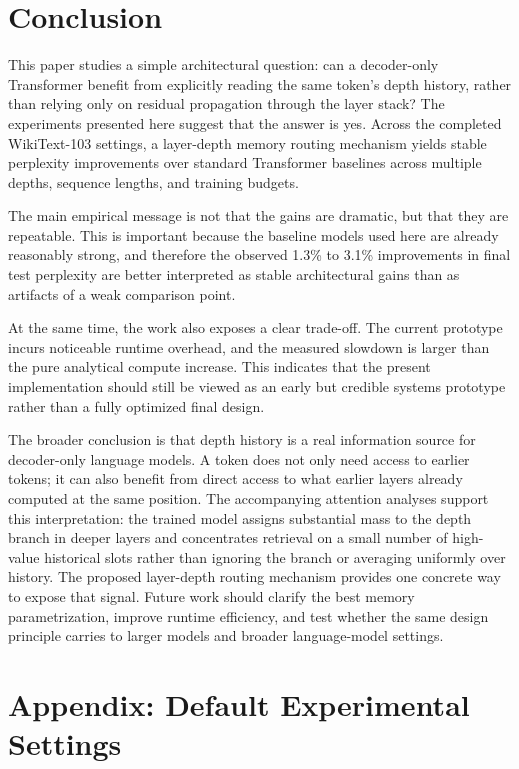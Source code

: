 \documentclass[11pt]{article}
\begin{document}
\section{Conclusion}

This paper studies a simple architectural question: can a decoder-only Transformer benefit from explicitly reading the same token's depth history, rather than relying only on residual propagation through the layer stack? The experiments presented here suggest that the answer is yes. Across the completed WikiText-103 settings, a layer-depth memory routing mechanism yields stable perplexity improvements over standard Transformer baselines across multiple depths, sequence lengths, and training budgets.

The main empirical message is not that the gains are dramatic, but that they are repeatable. This is important because the baseline models used here are already reasonably strong, and therefore the observed 1.3\% to 3.1\% improvements in final test perplexity are better interpreted as stable architectural gains than as artifacts of a weak comparison point.

At the same time, the work also exposes a clear trade-off. The current prototype incurs noticeable runtime overhead, and the measured slowdown is larger than the pure analytical compute increase. This indicates that the present implementation should still be viewed as an early but credible systems prototype rather than a fully optimized final design.

The broader conclusion is that depth history is a real information source for decoder-only language models. A token does not only need access to earlier tokens; it can also benefit from direct access to what earlier layers already computed at the same position. The accompanying attention analyses support this interpretation: the trained model assigns substantial mass to the depth branch in deeper layers and concentrates retrieval on a small number of high-value historical slots rather than ignoring the branch or averaging uniformly over history. The proposed layer-depth routing mechanism provides one concrete way to expose that signal. Future work should clarify the best memory parametrization, improve runtime efficiency, and test whether the same design principle carries to larger models and broader language-model settings.

\appendix

\section{Appendix: Default Experimental Settings}
\end{document}
